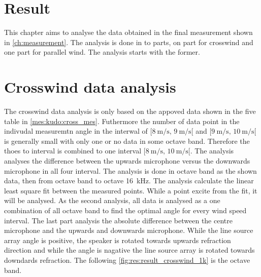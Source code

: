\section{Result}
This chapter aims to analyse the data obtained in the final measurement shown in \autoref{ch:measurement}. The analysis is done in to parts, on part for crosswind and one part for parallel wind. The analysis starts with the former. 



\section{Crosswind data analysis}\label{res:cross_data_ana}
The crosswind data analysis is only based on the appoved data shown in the five table in \autoref{mes:kudo:cross_mes}. Futhermore the number of data point in the indivudal measuremtn angle in the interwal of $[\SI{8}{\meter\per\second},\, \SI{9}{\meter\per\second}[ $ and $[\SI{9}{\meter\per\second},\, \SI{10}{\meter\per\second}[ $ is generally small with only one or no data in some octave band. Therefore the thoes to interval is combined to one interval $[\SI{8}{\meter\per\second},\, \SI{10}{\meter\per\second}[ $. The analysis analyses the difference between the upwards microphone versus the downwards microphone in all four interval. The analysis is done in octave band as the shown data, then from octave band  to octave \SI{16}{\kilo\hertz}. The analysis calculate the linear least square fit between the measured points. While a point excite  from the fit, it will be analysed. As the second analysis, all data is analysed as a one combination of all octave band to find the optimal angle for every wind speed interval. The last part analysis the absolute difference between the centre microphone and the upwards and downwards microphone. While the line source array angle is positive, the speaker is rotated towards upwards refraction direction and while the angle is nagative the line source array is rotated towards downdards refraction. The following \autoref{fig:res:result_crosswind_1k}  is the  octave band. 


 
